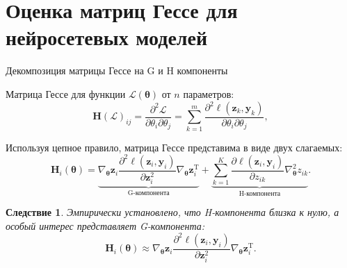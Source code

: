 \documentclass[10pt,pdf,hyperref={unicode}]{beamer}
\newtheorem{ruscorollary}{Следствие}
\begin{document}
\section{Оценка матриц Гессе для нейросетевых моделей}
\begin{frame}{Декомпозиция матрицы Гессе на G и H компоненты}
\justifying
\small

Матрица Гессе для функции $\mathcal{L}(\boldsymbol{\theta})$ от $n$ параметров:
\[
    \mathbf{H}(\mathcal{L})_{ij} = \frac{\partial^2 \mathcal{L}}{\partial \theta_i \partial \theta_j} = \sum_{k=1}^{m}\frac{\partial^2 \ell(\mathbf{z}_k, \mathbf{y}_k)}{\partial \theta_i \partial \theta_j},
\]

Используя цепное правило, матрица Гессе представима в виде двух слагаемых:
\[
    \mathbf{H}_{i}(\boldsymbol{\theta}) = \underbrace{\nabla_{\boldsymbol{\theta}} \mathbf{z}_i \dfrac{\partial^2 \ell(\mathbf{z}_i, \mathbf{y}_i)}{\partial \mathbf{z}_{i}^2} \nabla_{\boldsymbol{\theta}} \mathbf{z}_i^{\text{T}}}_{\text{G-компонента}} + \underbrace{\sum\limits_{k=1}^{K} \dfrac{\partial \ell(\mathbf{z}_i, \mathbf{y}_i)}{\partial z_{ik}} \nabla^2_{\boldsymbol{\theta}} z_{ik}}_{\text{H-компонента}}.
\]

\begin{ruscorollary}
    \justifying
    Эмпирически установлено, что H-компонента близка к нулю, а особый интерес представляет G-компонента:
\[
    \mathbf{H}_{i}(\boldsymbol{\theta}) \approx \nabla_{\boldsymbol{\theta}} \mathbf{z}_i \dfrac{\partial^2 \ell(\mathbf{z}_i, \mathbf{y}_i)}{\partial \mathbf{z}_{i}^2} \nabla_{\boldsymbol{\theta}} \mathbf{z}_i^{\text{T}}.
\]
\end{ruscorollary}
\end{frame}
\end{document}
